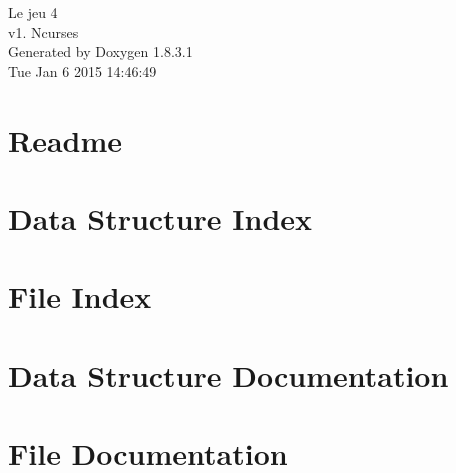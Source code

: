 \documentclass{book}
\begin{document}
\hypersetup{pageanchor=false,citecolor=blue}
\begin{titlepage}
\vspace*{7cm}
\begin{center}
{\Large Le jeu 4 \\[1ex]\large v1. Ncurses }\\
\vspace*{1cm}
{\large Generated by Doxygen 1.8.3.1}\\
\vspace*{0.5cm}
{\small Tue Jan 6 2015 14:46:49}\\
\end{center}
\end{titlepage}
\clearemptydoublepage
{}
\tableofcontents
\clearemptydoublepage
{}
\hypersetup{pageanchor=true,citecolor=blue}
\chapter{Readme}
\label{md_Readme}
\hypertarget{md_Readme}{}

\chapter{Data Structure Index}

\chapter{File Index}

\chapter{Data Structure Documentation}







\chapter{File Documentation}









\printindex
\end{document}
